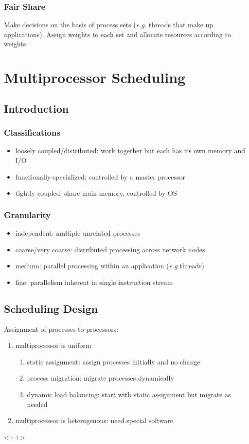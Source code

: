 \documentclass[]{article}
\theoremstyle{definition}
\begin{document}
	\subsubsection{Fair Share}
	Make decisions on the basis of process sets (\textit{e.g.} threads that make up applications).
	Assign weights to each set and allocate resources according to weights

	\section{Multiprocessor Scheduling}
	
	\subsection{Introduction}
	\subsubsection{Classifications}
	\begin{itemize}
		\item loosely coupled/distributed: work together but each has its own memory and I/O
		\item functionally-specialized: controlled by a master processor
		\item tightly coupled: share main memory, controlled by OS
	\end{itemize}

	\subsubsection{Granularity}
	\begin{itemize}
		\item independent: multiple unrelated processes
		\item coarse/very coarse: distributed processing across network nodes
		\item medium: parallel processing within an application (\textit{e.g} threads)
		\item fine: parallelism inherent in single instruction stream
	\end{itemize}

	
	\subsection{Scheduling Design}
	Assignment of processes to processors:
	\begin{enumerate}
		\item multiprocessor is uniform
			\begin{enumerate}
				\item static assignment: assign processes initially and no change
				\item process migration: migrate processes dynamically
				\item dynamic load balancing: start with static assignment but migrate as needed
			\end{enumerate}
		\item multiprocessor is heterogenous: need special software
	\end{enumerate}<++>
\end{document}
